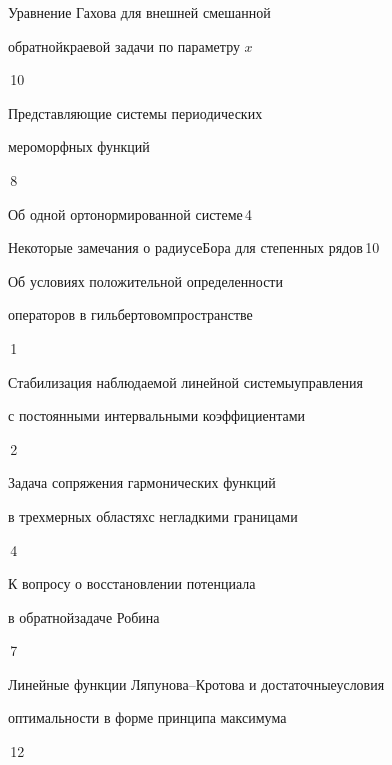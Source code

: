 

{Уравнение Гахова для внешней смешанной 


обратной\newline краевой задачи по параметру $x$}{\No\,10}




{Представляющие системы периодических 


мероморфных функций}{\No\,8}






{Об одной ортонормированной системе}{\No\,4}




{Некоторые замечания о радиусе\newline Бора для степенных рядов}{\No\,10}




{Об условиях положительной определенности


операторов в гильбертовом\newline пространстве}{\No\,1}




{Стабилизация наблюдаемой линейной системы\newline управления


с постоянными интервальными коэффициентами}{\No\,2}




{Задача сопряжения гармонических функций 


в трехмерных областях\newline с негладкими границами}{\No\,4}




{К вопросу о восстановлении потенциала 


в обратной\newline задаче Робина}{\No\,7}




{Линейные функции Ляпунова--Кротова и достаточные\newline условия


оптимальности в форме принципа максимума}{\No\,12}


